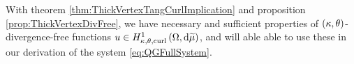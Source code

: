 With theorem \ref{thm:ThickVertexTangCurlImplication} and proposition \ref{prop:ThickVertexDivFree}, we have necessary and sufficient properties of $\left( \kappa, \theta \right)$-divergence-free functions $u\in H^1_{\kappa,\theta,\mathrm{curl}}\left( \Omega, \mathrm{d}\widetilde{\mu} \right)$, and will able able to use these in our derivation of the system \eqref{eq:QGFullSystem}.